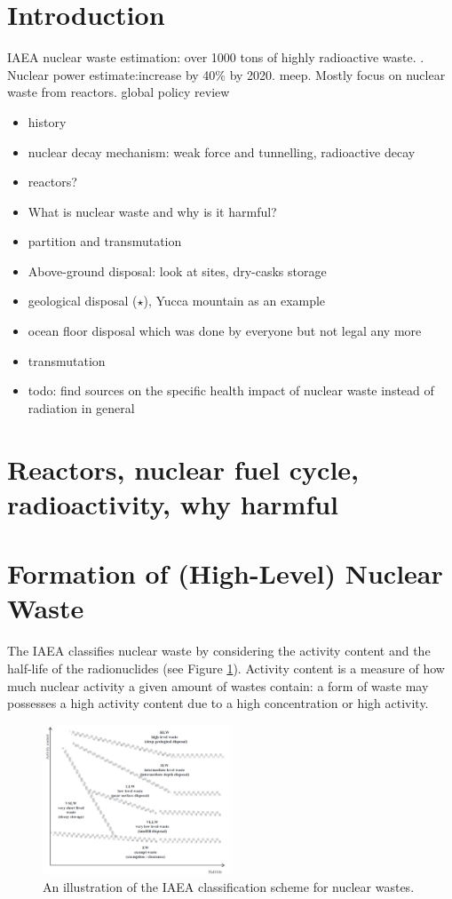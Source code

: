 \documentclass[preprint,aip,cha]{revtex4-1}
\begin{document}
\section{Introduction}
IAEA nuclear waste estimation: over 1000 tons of highly radioactive waste. \cite{iaea08}.
Nuclear power estimate:increase by 40\% by 2020. \cite{iaea12}
meep. Mostly focus on nuclear waste from reactors.
global policy review \cite{r12} 

\begin{itemize}
    \item history
    \item nuclear decay mechanism: weak force and tunnelling, radioactive decay
    \item reactors?
    \item What is nuclear waste and why is it harmful?
    \item partition and transmutation
    \item Above-ground disposal: look at sites, dry-casks storage
    \item geological disposal ($\star$), Yucca mountain as an example
    \item ocean floor disposal which was done by everyone but not legal any more
    \item transmutation
    \item todo: find sources on the specific health impact of nuclear waste instead of radiation
        in general
\end{itemize}

\section{Reactors, nuclear fuel cycle, radioactivity, why harmful}

\section{Formation of (High-Level) Nuclear Waste}
    The IAEA classifies nuclear waste by considering the activity content and the half-life
    of the radionuclides (see Figure \ref{fig:scheme}). Activity content is a measure of how much nuclear activity
    a given amount of wastes contain: a form of waste may possesses a high activity content due to
    a high concentration or high activity.\cite{iaea09}
    \begin{figure}[H]
        \centering
        \includegraphics[width=0.5\textwidth]{wastescheme.png}
        \caption{An illustration of the IAEA classification scheme for nuclear wastes.\cite{iaea09}}
        \label{fig:scheme}
    \end{figure}
\end{document}

